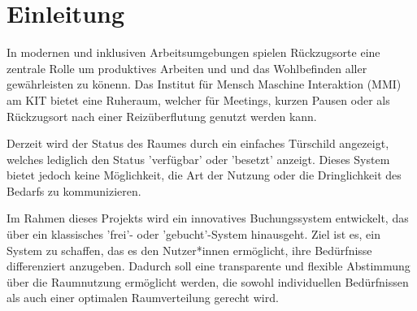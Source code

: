 \chapter{Einleitung}
In modernen und inklusiven Arbeitsumgebungen spielen Rückzugsorte eine zentrale Rolle um produktives Arbeiten und und das Wohlbefinden aller gewährleisten zu könenn.
Das Institut für Mensch Maschine Interaktion (MMI) am KIT bietet eine Ruheraum, welcher für Meetings, kurzen Pausen oder als Rückzugsort nach einer Reizüberflutung genutzt werden kann.

Derzeit wird der Status des Raumes durch ein einfaches Türschild angezeigt, welches lediglich den Status 'verfügbar' oder 'besetzt' anzeigt.
Dieses System bietet jedoch keine Möglichkeit, die Art der Nutzung oder die Dringlichkeit des Bedarfs zu kommunizieren.

Im Rahmen dieses Projekts wird ein innovatives Buchungssystem entwickelt, das über ein klassisches 'frei'- oder 'gebucht'-System hinausgeht.
Ziel ist es, ein System zu schaffen, das es den Nutzer*innen ermöglicht, ihre Bedürfnisse differenziert anzugeben.
Dadurch soll eine transparente und flexible Abstimmung über die Raumnutzung ermöglicht werden, die sowohl individuellen Bedürfnissen als auch einer optimalen Raumverteilung gerecht wird.